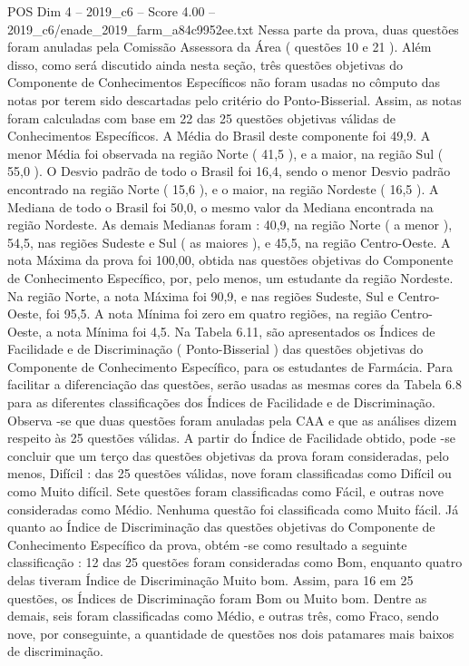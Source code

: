 \begin{textsample}{POS Dim 4 – 2019\_c6 – Score 4.00 – 2019\_c6/enade\_2019\_farm\_a84c9952ee.txt}
Nessa parte da prova, duas questões foram anuladas pela Comissão Assessora da Área ( questões 10 e 21 ).
Além disso, como será discutido ainda nesta seção, três questões objetivas do Componente de Conhecimentos Específicos não foram usadas no cômputo das notas por terem sido descartadas pelo critério do Ponto-Bisserial.
Assim, as notas foram calculadas com base em 22 das 25 questões objetivas válidas de Conhecimentos Específicos.
A Média do Brasil deste componente foi 49,9.
A menor Média foi observada na região Norte ( 41,5 ), e a maior, na região Sul ( 55,0 ).
O Desvio padrão de todo o Brasil foi 16,4, sendo o menor Desvio padrão encontrado na região Norte ( 15,6 ), e o maior, na região Nordeste ( 16,5 ).
A Mediana de todo o Brasil foi 50,0, o mesmo valor da Mediana encontrada na região Nordeste.
As demais Medianas foram : 40,9, na região Norte ( a menor ), 54,5, nas regiões Sudeste e Sul ( as maiores ), e 45,5, na região Centro-Oeste.
A nota Máxima da prova foi 100,00, obtida nas questões objetivas do Componente de Conhecimento Específico, por, pelo menos, um estudante da região Nordeste.
Na região Norte, a nota Máxima foi 90,9, e nas regiões Sudeste, Sul e Centro-Oeste, foi 95,5.
A nota Mínima foi zero em quatro regiões, na região Centro-Oeste, a nota Mínima foi 4,5.
Na Tabela 6.11, são apresentados os Índices de Facilidade e de Discriminação ( Ponto-Bisserial ) das questões objetivas do Componente de Conhecimento Específico, para os estudantes de Farmácia.
Para facilitar a diferenciação das questões, serão usadas as mesmas cores da Tabela 6.8 para as diferentes classificações dos Índices de Facilidade e de Discriminação.
Observa -se que duas questões foram anuladas pela CAA e que as análises dizem respeito às 25 questões válidas.
A partir do Índice de Facilidade obtido, pode -se concluir que um terço das questões objetivas da prova foram consideradas, pelo menos, Difícil : das 25 questões válidas, nove foram classificadas como Difícil ou como Muito difícil.
Sete questões foram classificadas como Fácil, e outras nove consideradas como Médio.
Nenhuma questão foi classificada como Muito fácil.
Já quanto ao Índice de Discriminação das questões objetivas do Componente de Conhecimento Específico da prova, obtém -se como resultado a seguinte classificação : 12 das 25 questões foram consideradas como Bom, enquanto quatro delas tiveram Índice de Discriminação Muito bom.
Assim, para 16 em 25 questões, os Índices de Discriminação foram Bom ou Muito bom.
Dentre as demais, seis foram classificadas como Médio, e outras três, como Fraco, sendo nove, por conseguinte, a quantidade de questões nos dois patamares mais baixos de discriminação.

\end{textsample}
